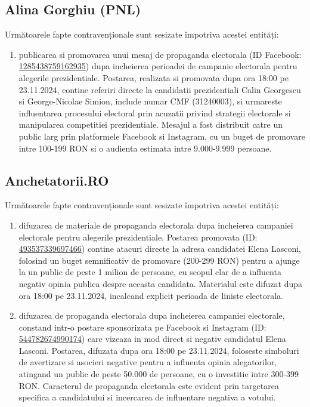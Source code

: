 \documentclass[a4paper,12pt]{article}
\begin{document}
\vspace{0.5cm}

\subsection{Alina Gorghiu (PNL)}
Următoarele fapte contravenționale sunt sesizate împotriva acestei entități:

\begin{enumerate}[leftmargin=*, label=\arabic*.)]
    \item publicarea si promovarea unui mesaj de propaganda electorala (ID Facebook: \href{https://www.facebook.com/ads/library/?id=1285438759162935}{1285438759162935}) dupa incheierea perioadei de campanie electorala pentru alegerile prezidentiale. Postarea, realizata si promovata dupa ora 18:00 pe 23.11.2024, contine referiri directe la candidatii prezidentiali Calin Georgescu si George-Nicolae Simion, include numar CMF (31240003), si urmareste influentarea procesului electoral prin acuzatii privind strategii electorale si manipularea competitiei prezidentiale. Mesajul a fost distribuit catre un public larg prin platformele Facebook si Instagram, cu un buget de promovare intre 100-199 RON si o audienta estimata intre 9.000-9.999 persoane.
\end{enumerate}

\vspace{0.5cm}

\subsection{Anchetatorii.RO}
Următoarele fapte contravenționale sunt sesizate împotriva acestei entități:

\begin{enumerate}[leftmargin=*, label=\arabic*.)]
    \item difuzarea de materiale de propaganda electorala dupa incheierea campaniei electorale pentru alegerile prezidentiale. Postarea promovata (ID: \href{https://www.facebook.com/ads/library/?id=493537339697466}{493537339697466}) contine atacuri directe la adresa candidatei Elena Lasconi, folosind un buget semnificativ de promovare (200-299 RON) pentru a ajunge la un public de peste 1 milion de persoane, cu scopul clar de a influenta negativ opinia publica despre aceasta candidata. Materialul este difuzat dupa ora 18:00 pe 23.11.2024, incalcand explicit perioada de liniste electorala.
    \item difuzarea de propaganda electorala dupa incheierea campaniei electorale, constand intr-o postare sponsorizata pe Facebook si Instagram (ID: \href{https://www.facebook.com/ads/library/?id=544782674990174}{544782674990174}) care vizeaza in mod direct si negativ candidatul Elena Lasconi. Postarea, difuzata dupa ora 18:00 pe 23.11.2024, foloseste simboluri de avertizare si asocieri negative pentru a influenta opinia alegatorilor, atingand un public de peste 50.000 de persoane, cu o investitie intre 300-399 RON. Caracterul de propaganda electorala este evident prin targetarea specifica a candidatului si incercarea de influentare negativa a votului.
\end{enumerate}
\end{document}
